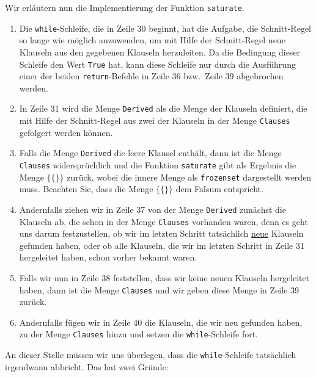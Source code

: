 Wir erläutern nun die Implementierung der Funktion \texttt{saturate}.
\begin{enumerate}
\item Die \texttt{while}-Schleife, die in Zeile 30 beginnt, hat die Aufgabe, die Schnitt-Regel
      so lange wie möglich anzuwenden, um mit Hilfe der Schnitt-Regel neue Klauseln aus den gegebenen
      Klauseln herzuleiten.  Da die Bedingung dieser Schleife den Wert \texttt{True} hat, kann diese
      Schleife nur durch die Ausführung einer der beiden \texttt{return}-Befehle in Zeile 36 bzw.~Zeile 39
      abgebrochen werden. 
\item In Zeile 31 wird die Menge \texttt{Derived} als die Menge der Klauseln definiert, die mit Hilfe der
      Schnitt-Regel aus zwei der Klauseln in der Menge \texttt{Clauses} gefolgert werden können.
\item Falls die Menge \texttt{Derived} die leere Klausel enthält, dann ist die Menge
      \texttt{Clauses} widersprüchlich und die Funktion \texttt{saturate} gibt als Ergebnis die
      Menge $\bigl\{ \{\} \bigr\}$ zurück, wobei die innere Menge als \texttt{frozenset} dargestellt werden
      muss.  Beachten Sie, dass die Menge $\bigl\{ \{\} \bigr\}$ dem Falsum entspricht.
\item Andernfalls ziehen wir in Zeile 37 von der Menge \texttt{Derived} zunächst die Klauseln
      ab, die schon in der Menge \texttt{Clauses} vorhanden waren, denn es geht uns darum
      festzustellen, ob wir im letzten Schritt tatsächlich 
      \underline{neue} Klauseln gefunden haben, oder ob alle Klauseln, die wir im letzten Schritt in Zeile 31
      hergeleitet haben, schon vorher bekannt waren.
\item Falls wir nun in Zeile 38 feststellen, dass wir keine neuen Klauseln hergeleitet haben,
      dann ist die Menge \texttt{Clauses}  und wir geben diese Menge in Zeile 39 zurück.
\item Andernfalls fügen wir in Zeile 40 die Klauseln, die wir neu gefunden haben, zu der Menge
      \texttt{Clauses} hinzu und setzen die \texttt{while}-Schleife fort.
\end{enumerate}
An dieser Stelle müssen wir uns überlegen, dass die \texttt{while}-Schleife tatsächlich irgendwann
abbricht.  Das hat zwei Gründe:  
